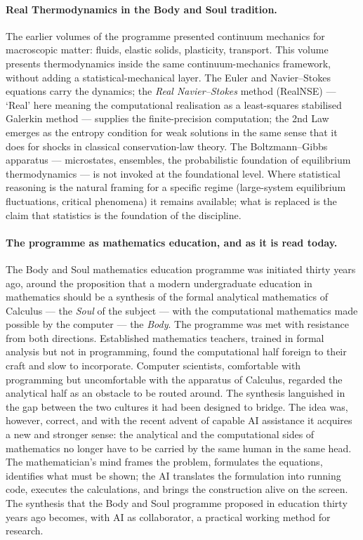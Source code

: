 \paragraph{Real Thermodynamics in the Body and Soul tradition.}
The earlier volumes of the programme presented continuum mechanics for macroscopic matter: fluids, elastic solids, plasticity, transport. This volume presents thermodynamics inside the same continuum-mechanics framework, without adding a statistical-mechanical layer. The Euler and Navier--Stokes equations carry the dynamics; the \emph{Real Navier--Stokes} method (RealNSE) --- `Real' here meaning the computational realisation as a least-squares stabilised Galerkin method --- supplies the finite-precision computation; the 2nd Law emerges as the entropy condition for weak solutions in the same sense that it does for shocks in classical conservation-law theory. The Boltzmann--Gibbs apparatus --- microstates, ensembles, the probabilistic foundation of equilibrium thermodynamics --- is not invoked at the foundational level. Where statistical reasoning is the natural framing for a specific regime (large-system equilibrium fluctuations, critical phenomena) it remains available; what is replaced is the claim that statistics is the foundation of the discipline.

\paragraph{The programme as mathematics education, and as it is read today.}
The Body and Soul mathematics education programme was initiated thirty years ago, around the proposition that a modern undergraduate education in mathematics should be a synthesis of the formal analytical mathematics of Calculus --- the \emph{Soul} of the subject --- with the computational mathematics made possible by the computer --- the \emph{Body}. The programme was met with resistance from both directions. Established mathematics teachers, trained in formal analysis but not in programming, found the computational half foreign to their craft and slow to incorporate. Computer scientists, comfortable with programming but uncomfortable with the apparatus of Calculus, regarded the analytical half as an obstacle to be routed around. The synthesis languished in the gap between the two cultures it had been designed to bridge. The idea was, however, correct, and with the recent advent of capable AI assistance it acquires a new and stronger sense: the analytical and the computational sides of mathematics no longer have to be carried by the same human in the same head. The mathematician's mind frames the problem, formulates the equations, identifies what must be shown; the AI translates the formulation into running code, executes the calculations, and brings the construction alive on the screen. The synthesis that the Body and Soul programme proposed in education thirty years ago becomes, with AI as collaborator, a practical working method for research.

